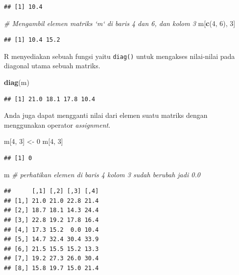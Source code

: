 \documentclass[]{book}
\newenvironment{Shaded}{\begin{snugshade}}{\end{snugshade}}
\newcommand{\CommentTok}[1]{\textcolor[rgb]{0.56,0.35,0.01}{\textit{#1}}}
\newcommand{\DecValTok}[1]{\textcolor[rgb]{0.00,0.00,0.81}{#1}}
\newcommand{\KeywordTok}[1]{\textcolor[rgb]{0.13,0.29,0.53}{\textbf{#1}}}
\newcommand{\NormalTok}[1]{#1}
\newcommand{\StringTok}[1]{\textcolor[rgb]{0.31,0.60,0.02}{#1}}
\begin{document}
\begin{verbatim}
## [1] 10.4
\end{verbatim}

\begin{Shaded}
\begin{Highlighting}[]
\CommentTok{# Mengambil elemen matriks `m` di baris 4 dan 6, dan kolom 3}
\NormalTok{m[}\KeywordTok{c}\NormalTok{(}\DecValTok{4}\NormalTok{, }\DecValTok{6}\NormalTok{), }\DecValTok{3}\NormalTok{]}
\end{Highlighting}
\end{Shaded}

\begin{verbatim}
## [1] 10.4 15.2
\end{verbatim}

R menyediakan sebuah fungsi yaitu \texttt{diag()} untuk mengakses nilai-nilai pada diagonal utama sebuah matriks.

\begin{Shaded}
\begin{Highlighting}[]
\KeywordTok{diag}\NormalTok{(m)}
\end{Highlighting}
\end{Shaded}

\begin{verbatim}
## [1] 21.0 18.1 17.8 10.4
\end{verbatim}

Anda juga dapat mengganti nilai dari elemen suatu matriks dengan menggunakan operator \emph{assignment}.

\begin{Shaded}
\begin{Highlighting}[]
\NormalTok{m[}\DecValTok{4}\NormalTok{, }\DecValTok{3}\NormalTok{] <-}\StringTok{ }\DecValTok{0}
\NormalTok{m[}\DecValTok{4}\NormalTok{, }\DecValTok{3}\NormalTok{]}
\end{Highlighting}
\end{Shaded}

\begin{verbatim}
## [1] 0
\end{verbatim}

\begin{Shaded}
\begin{Highlighting}[]
\NormalTok{m }\CommentTok{# perhatikan elemen di baris 4 kolom 3 sudah berubah jadi 0.0}
\end{Highlighting}
\end{Shaded}

\begin{verbatim}
##      [,1] [,2] [,3] [,4]
## [1,] 21.0 21.0 22.8 21.4
## [2,] 18.7 18.1 14.3 24.4
## [3,] 22.8 19.2 17.8 16.4
## [4,] 17.3 15.2  0.0 10.4
## [5,] 14.7 32.4 30.4 33.9
## [6,] 21.5 15.5 15.2 13.3
## [7,] 19.2 27.3 26.0 30.4
## [8,] 15.8 19.7 15.0 21.4
\end{verbatim}
\end{document}
